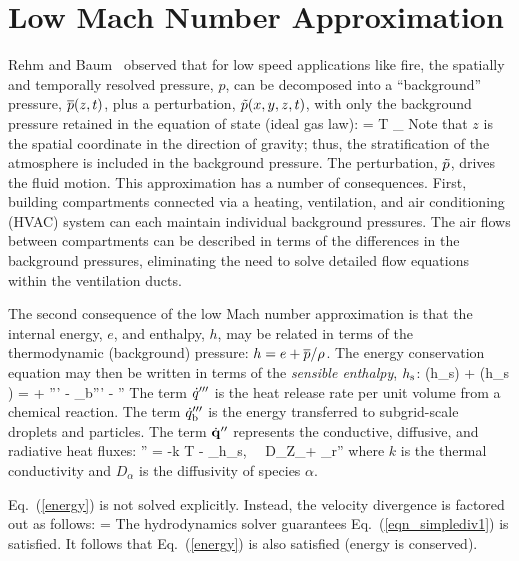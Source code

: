 \section{Low Mach Number Approximation}

Rehm and Baum~\cite{Rehm:1} observed that for low speed applications like fire, the spatially and temporally resolved pressure, $p$, can be decomposed into a ``background'' pressure, $\overline{p}(z,t)$, plus a perturbation, $\tilde{p}(x,y,z,t)$, with only the background pressure retained in the equation of state (ideal gas law):
\be \bp = \rho T \calR \sum_\alpha  {} \equiv {}  \label{basicstate1} \ee
Note that $z$ is the spatial coordinate in the direction of gravity; thus, the stratification of the atmosphere is included in the background pressure. The perturbation, $\tilde{p}$, drives the fluid motion. This approximation has a number of consequences. First, building compartments connected via a heating, ventilation, and air conditioning (HVAC) system can each maintain individual background pressures. The air flows between compartments can be
described in terms of the differences in the background pressures, eliminating the need to solve detailed flow equations within the ventilation ducts.

The second consequence of the low Mach number approximation is that the internal energy, $e$, and enthalpy, $h$, may be related in terms of the thermodynamic (background) pressure: $h = e + \overline{p}/\rho$.  The energy conservation equation may then be written in terms of the {\em sensible enthalpy}, $h_{\rm s}$:
\be {}(\rho h_{\rm s}) + \nabla\!\cdot (\rho h_{\rm s} \bu) =  + \dq''' - \dq_{\rm b}'''
        - \nabla\!\cdot \dbq'' \label{energy} \ee
The term
$\dot{q}'''$ is the heat release rate per unit volume from a chemical reaction.
The term $\dot{q}_{\rm b}'''$ is the energy transferred to subgrid-scale droplets and particles.
The term $\dot{\mathbf{q}}''$ represents the conductive, diffusive, and radiative heat fluxes:
\be
   \dbq'' = -k \nabla T - \sum_\alpha h_{\rm s,\alpha} \, \rho \, D_\alpha \nabla Z_\alpha + \dbq_{\rm r}''
\ee
where $k$ is the thermal conductivity and $D_\alpha$ is the diffusivity of species $\alpha$.

Eq.~(\ref{energy}) is not solved explicitly. Instead, the velocity divergence is factored out as follows:
\be
\label{eqn_simplediv1}
\Div{} =  
\ee
The hydrodynamics solver guarantees Eq.~(\ref{eqn_simplediv1}) is satisfied.  It follows that Eq.~(\ref{energy}) is also satisfied (energy is conserved).

